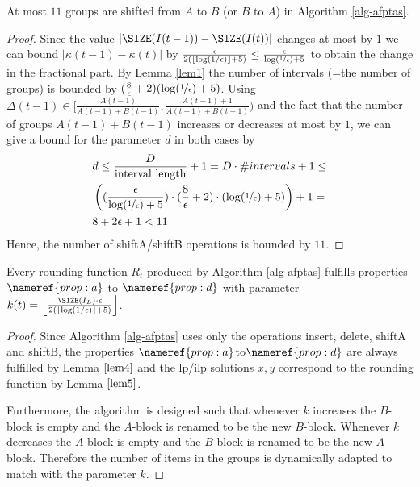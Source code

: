 \begin{lemma}
\label{lem:disbounded}
At most $11$ groups are shifted from $A$ to $B$ (or $B$ to $A$) in Algorithm \ref{alg-afptas}.
\end{lemma}

\begin{proof}
Since the value $|\SIZE(I(t-1))-\SIZE(I(t))|$ changes at most by $1$ we can bound $|\kappa(t-1) - \kappa(t)|$ by $\frac{\epsilon}{2(\lfloor \log(1/\epsilon)\rfloor +5)}\leq \frac{\epsilon}{\log(\nicefrac{1}{\epsilon})+5}$ to obtain the change in the fractional part. By  Lemma \ref{lem1} the number of intervals (=the number of groups) is bounded by $(\frac{8}{\epsilon}+2)(\log (\nicefrac{1}{\epsilon})+5)$. Using $\Delta(t-1) \in [ \frac{A(t-1)}{A(t-1)+B(t-1)}, \frac{A(t-1)+1}{A(t-1)+B(t-1)})$ and the fact that the number of groups $A(t-1)+B(t-1)$ increases or decreases at most by $1$, we can give a bound for the parameter $d$ in both cases by
\begin{align*}
&d \leq \frac{D}{\text{interval length}} +1 = D \cdot \#intervals +1 \leq \\
&\left((\frac{\epsilon}{\log (\nicefrac{1}{\epsilon})+5})\cdot (\frac{8}{\epsilon}+2)\cdot (\log(\nicefrac{1}{\epsilon})+5)\right)+1=\\
&8+2\epsilon +1 < 11
\end{align*}
Hence, the number of shiftA/shiftB operations is bounded by $11$.
\end{proof}


\begin{lemma}
\label{lem:binpackingalg}
    Every rounding function $R_t$ produced by Algorithm \ref{alg-afptas} fulfills properties $\nameref{prop:a}$ to $\nameref{prop:d}$ with parameter $k(t)= \left\lfloor \frac{\SIZE(I_{L})\cdot \epsilon}{2(\lfloor \log(1/\epsilon)\rfloor +5)}\right\rfloor$.
\end{lemma}

\begin{proof}
Since Algorithm \ref{alg-afptas} uses only the operations insert, delete, shiftA and shiftB, the properties $\nameref{prop:a}$to$\nameref{prop:d}$ are always fulfilled by Lemma $\ref{lem4}$ and the \ac{lp}/\ac{ilp} solutions $x,y$ correspond to the rounding function by Lemma $\ref{lem5}$. 

Furthermore, the algorithm is designed such that whenever $k$ increases the $B$-block is empty and the $A$-block is renamed to be the new $B$-block. Whenever $k$ decreases the $A$-block is empty and the $B$-block is renamed to be the new $A$-block. Therefore the number of items in the groups is dynamically adapted to match with the parameter $k$.
\end{proof}


